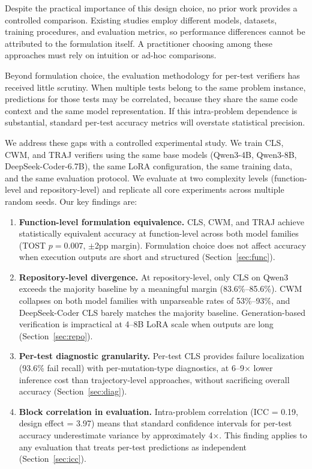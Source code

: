 \documentclass[11pt,a4paper]{article}
\begin{document}
Despite the practical importance of this design choice, no prior work provides a controlled comparison. Existing studies employ different models, datasets, training procedures, and evaluation metrics, so performance differences cannot be attributed to the formulation itself. A practitioner choosing among these approaches must rely on intuition or ad-hoc comparisons.

Beyond formulation choice, the evaluation methodology for per-test verifiers has received little scrutiny. When multiple tests belong to the same problem instance, predictions for those tests may be correlated, because they share the same code context and the same model representation. If this intra-problem dependence is substantial, standard per-test accuracy metrics will overstate statistical precision.

We address these gaps with a controlled experimental study. We train CLS, CWM, and TRAJ verifiers using the same base models (Qwen3-4B, Qwen3-8B, DeepSeek-Coder-6.7B), the same LoRA configuration, the same training data, and the same evaluation protocol. We evaluate at two complexity levels (function-level and repository-level) and replicate all core experiments across multiple random seeds. Our key findings are:

\begin{enumerate}
\item \textbf{Function-level formulation equivalence.} CLS, CWM, and TRAJ achieve statistically equivalent accuracy at function-level across both model families (TOST $p{=}0.007$, $\pm$2pp margin). Formulation choice does not affect accuracy when execution outputs are short and structured (Section~\ref{sec:func}).

\item \textbf{Repository-level divergence.} At repository-level, only CLS on Qwen3 exceeds the majority baseline by a meaningful margin (83.6\%--85.6\%). CWM collapses on both model families with unparseable rates of 53\%--93\%, and DeepSeek-Coder CLS barely matches the majority baseline. Generation-based verification is impractical at 4--8B LoRA scale when outputs are long (Section~\ref{sec:repo}).

\item \textbf{Per-test diagnostic granularity.} Per-test CLS provides failure localization (93.6\% fail recall) with per-mutation-type diagnostics, at 6--9$\times$ lower inference cost than trajectory-level approaches, without sacrificing overall accuracy (Section~\ref{sec:diag}).

\item \textbf{Block correlation in evaluation.} Intra-problem correlation (ICC = 0.19, design effect = 3.97) means that standard confidence intervals for per-test accuracy underestimate variance by approximately 4$\times$. This finding applies to any evaluation that treats per-test predictions as independent (Section~\ref{sec:icc}).
\end{enumerate}
\end{document}
